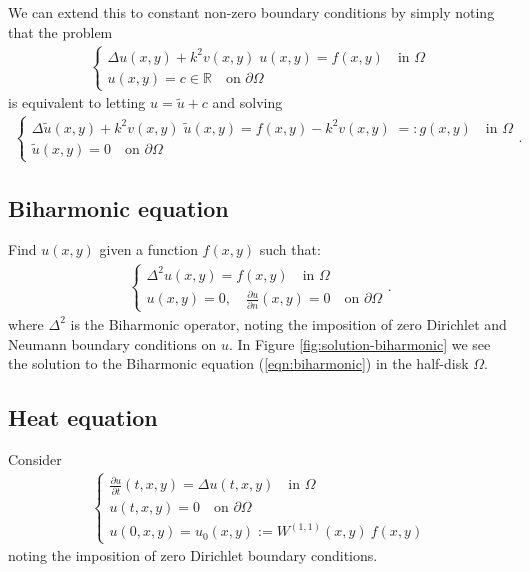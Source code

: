 \documentclass[11pt, oneside]{article}   	%
\newcommand{\R}{\mathbb{R}}
\newcommand{\Wii}{W^{(1,1)}}
\begin{document}
We can extend this to constant non-zero boundary conditions by simply noting that the problem 
\begin{align}
	\begin{cases}
    		\Delta u(x,y) + k^2 v(x,y) \; u(x,y) = f(x,y) \quad \text{in } \Omega \\
		u(x,y) = c \in \R \quad \text{on } \partial \Omega
	\end{cases}
\end{align}
is equivalent to letting $u = \tilde{u} + c$ and solving
\begin{align}
	\begin{cases}
    		\Delta \tilde{u}(x,y) + k^2 v(x,y) \; \tilde{u}(x,y) = f(x,y) - k^2 v(x,y) \; =: g(x,y)  \quad \text{in } \Omega \\
		\tilde{u}(x,y) = 0 \quad \text{on } \partial \Omega
	\end{cases}.
\end{align}


\subsection{Biharmonic equation}

Find \(u(x,y)\) given a function \(f(x,y)\) such that:
\begin{align}
	\begin{cases}
    		\Delta^2 u(x,y) = f(x,y) \quad \text{in } \Omega \\
		u(x,y) = 0, \quad \frac{\partial u}{\partial n}(x,y) = 0 \quad \text{on } \partial \Omega
	\end{cases}.
	\label{eqn:biharmonic}
\end{align}
where $\Delta^2$ is the Biharmonic operator, noting the imposition of zero Dirichlet and Neumann boundary conditions on $u$. In Figure \ref{fig:solution-biharmonic} we see the solution to the Biharmonic equation (\ref{eqn:biharmonic}) in the half-disk $\Omega$.


\subsection{Heat equation}
Consider
\begin{align}
	\begin{cases}
		\frac{\partial u}{\partial t}(t,x,y) = \Delta u(t,x,y) \quad \text{in } \Omega \\
		u(t, x, y) = 0 \quad \text{on } \partial \Omega \\
		u(0, x, y) = u_0(x,y) := \Wii(x,y) \: f(x,y)
	\end{cases}
\end{align}
noting the imposition of zero Dirichlet boundary conditions.
\end{document}
